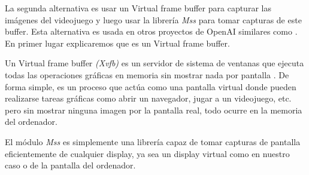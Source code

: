La segunda alternativa es usar un Virtual frame buffer para capturar las imágenes del videojuego y luego usar la librería \textit{Mss} \cite {mss} para tomar capturas de este buffer. Esta alternativa es usada en otros proyectos de OpenAI similares como \cite {muphen}. En primer lugar explicaremos que es un Virtual frame buffer.

Un Virtual frame buffer \textit{(Xvfb)} es un servidor de sistema de ventanas que ejecuta todas las operaciones gráficas en memoria sin mostrar nada por pantalla \cite {xvfb-wikipedia}. De forma simple, es un proceso que actúa como una pantalla virtual donde pueden realizarse tareas gráficas como abrir un navegador, jugar a un videojuego, etc. pero sin mostrar ninguna imagen por la pantalla real, todo ocurre en la memoria del ordenador.

El módulo \textit{Mss} es simplemente una librería capaz de tomar capturas de pantalla eficientemente de cualquier display, ya sea un display virtual como en nuestro caso o de la pantalla del ordenador.

